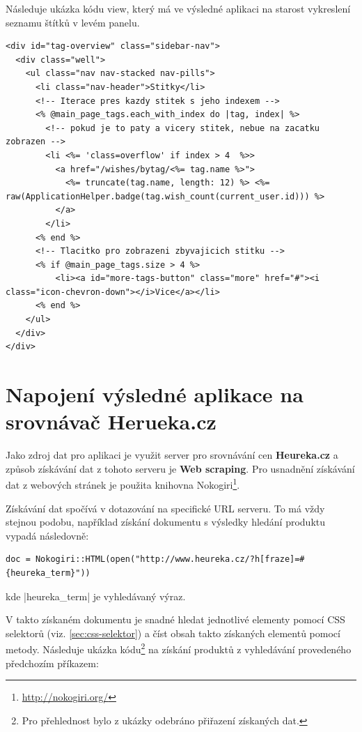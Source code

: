Následuje ukázka kódu view, který má ve výsledné aplikaci na starost vykreslení seznamu štítků v levém panelu.

\lstset{language = html, style=custom}
\begin{lstlisting}
<div id="tag-overview" class="sidebar-nav">
  <div class="well">
    <ul class="nav nav-stacked nav-pills">
      <li class="nav-header">Stitky</li>
      <!-- Iterace pres kazdy stitek s jeho indexem -->
      <% @main_page_tags.each_with_index do |tag, index| %>
        <!-- pokud je to paty a vicery stitek, nebue na zacatku zobrazen -->
        <li <%= 'class=overflow' if index > 4  %>>
          <a href="/wishes/bytag/<%= tag.name %>">
            <%= truncate(tag.name, length: 12) %> <%= raw(ApplicationHelper.badge(tag.wish_count(current_user.id))) %>
          </a>
        </li>
      <% end %>
      <!-- Tlacitko pro zobrazeni zbyvajicich stitku -->
      <% if @main_page_tags.size > 4 %>
          <li><a id="more-tags-button" class="more" href="#"><i class="icon-chevron-down"></i>Vice</a></li>
      <% end %>
    </ul>
  </div>
</div>
\end{lstlisting}

\section{Napojení výsledné aplikace na srovnávač Herueka.cz}
Jako zdroj dat pro aplikaci je využit server pro srovnávání cen \textbf{Heureka.cz} a způsob získávání dat z tohoto serveru je \textbf{Web scraping}. Pro usnadnění získávání dat z webových stránek je použita knihovna Nokogiri\footnote{\url{http://nokogiri.org/}}.

Získávání dat spočívá v dotazování na specifické URL serveru. To má vždy stejnou podobu, například získání dokumentu s výsledky hledání produktu vypadá následovně:

\lstset{language = ruby, style=custom}
\begin{lstlisting}
doc = Nokogiri::HTML(open("http://www.heureka.cz/?h[fraze]=#{heureka_term}"))
\end{lstlisting}

\noindent kde |heureka_term| je vyhledávaný výraz.

V takto získaném dokumentu je snadné hledat jednotlivé elementy pomocí CSS selektorů (viz. \ref{sec:css-selektor}) a číst obsah takto získaných elementů pomocí metody. Následuje ukázka kódu\footnote{Pro přehlednost bylo z ukázky odebráno přiřazení získaných dat.} na získání produktů z vyhledávání provedeného předchozím příkazem:

